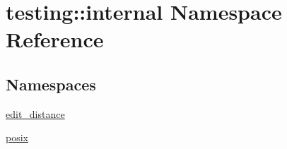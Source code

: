 \hypertarget{namespacetesting_1_1internal}{}\section{testing\+:\+:internal Namespace Reference}
\label{namespacetesting_1_1internal}
\subsection*{Namespaces}
\begin{DoxyCompactItemize}
\item 
 \hyperlink{namespacetesting_1_1internal_1_1edit__distance}{edit\+\_\+distance}
\item 
 \hyperlink{namespacetesting_1_1internal_1_1posix}{posix}
\end{DoxyCompactItemize}
